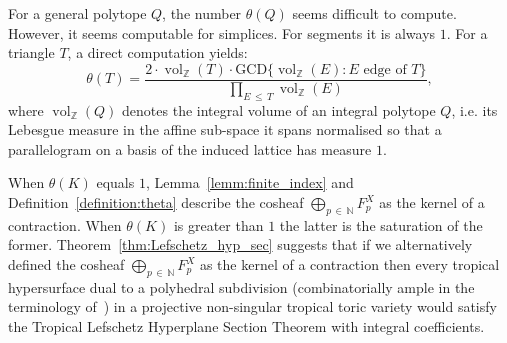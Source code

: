 \documentclass[AHL,Unicode,longabstracts,published]{cedram}
\newcommand{\Z}{\mathbb{Z}}
\newcommand{\N}{\mathbb{N}}
\DeclareMathOperator{\vol}{vol}
\begin{document}
For a general polytope $Q$, the number $\theta(Q)$ seems difficult to compute. However, it seems computable for simplices. For segments it is always $1$. For a triangle $T$, a direct computation yields:
\begin{equation*}
\theta(T)=\frac{2\cdot\vol_\Z(T)\cdot\text{GCD}\{\vol_\Z(E) \colon E \text{ edge of }T\}}{\displaystyle\prod_{E\,\leq\,T} \vol_\Z(E)},
\end{equation*}
where $\vol_\Z(Q)$ denotes the integral volume of an integral polytope $Q$, i.e. its Lebesgue measure in the affine sub-space it spans normalised so that a parallelogram on a basis of the induced lattice has measure $1$.


When $\theta(K)$ equals $1$, Lemma~\ref{lemm:finite_index} and Definition~\ref{definition:theta} describe the cosheaf $\bigoplus_{p\,\in\,\N} F^{X}_p$ as the kernel of a contraction. When $\theta(K)$ is greater than $1$ the latter is the saturation of the former. Theorem~\ref{thm:Lefschetz_hyp_sec} suggests that if we alternatively defined the cosheaf $\bigoplus_{p\,\in\,\N} F^{X}_p$ as the kernel of a contraction then every tropical hypersurface dual to a polyhedral subdivision (combinatorially ample in the terminology of~\cite{Arn-Ren-Sha_Lef_sec}) in a projective non-singular tropical toric variety would satisfy the Tropical Lefschetz Hyperplane Section Theorem with integral coefficients.








\end{document}
